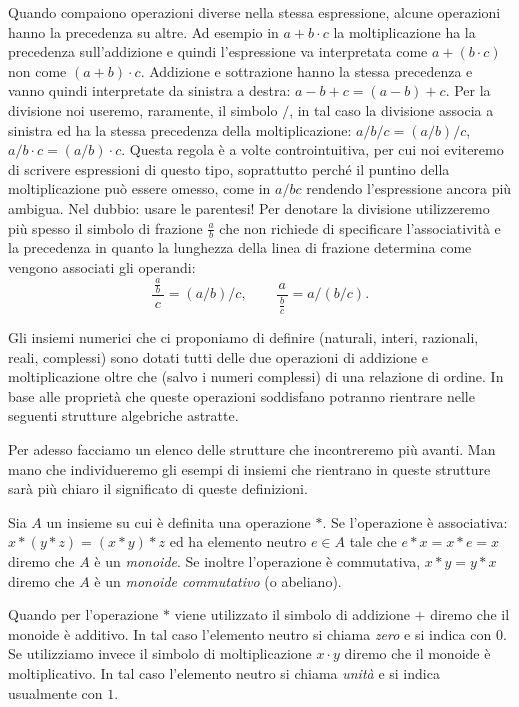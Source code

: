Quando compaiono operazioni diverse nella stessa espressione, alcune operazioni 
hanno la precedenza su altre.
Ad esempio in $a+b\cdot c$ la moltiplicazione ha la precedenza sull'addizione
e quindi l'espressione va interpretata come $a+(b\cdot c)$ non come $(a+b)\cdot c$.
Addizione e sottrazione hanno la stessa precedenza e vanno quindi interpretate da sinistra a destra:
$a-b+c = (a-b)+c$. Per la divisione noi useremo, raramente, il simbolo $/$, 
in tal caso la divisione associa a sinistra ed ha la stessa precedenza della 
moltiplicazione: $a/b/c=(a/b)/c$, $a/b\cdot c=(a/b)\cdot c$.
Questa regola è a volte controintuitiva, per cui noi eviteremo di scrivere 
espressioni di questo tipo, soprattutto perché il puntino della moltiplicazione 
può essere omesso, come in $a/bc$ rendendo l'espressione ancora più ambigua.
Nel dubbio: usare le parentesi!
Per denotare la divisione utilizzeremo più spesso il simbolo di frazione $\frac a b$ che non richiede 
di specificare l'associatività e la precedenza in quanto la lunghezza della 
linea di frazione determina come vengono associati gli operandi: 
\[
  \frac{\,\frac a b\,}{c}=(a/b)/c, \qquad 
  \frac{a}{\,\frac bc\,}=a/(b/c).
\]  

Gli insiemi numerici che ci proponiamo di definire (naturali, interi, razionali, reali, complessi)
sono dotati tutti delle due operazioni di addizione e moltiplicazione
oltre che (salvo i numeri complessi) di una relazione di ordine.
In base alle proprietà che queste operazioni soddisfano potranno rientrare nelle 
seguenti strutture algebriche astratte. 

Per adesso facciamo un elenco delle strutture che incontreremo più avanti. 
Man mano che individueremo gli esempi di insiemi che rientrano in queste strutture
sarà più chiaro il significato di queste definizioni.

\begin{definition}[monoide]%
  \label{def:monoide}%
  Sia $A$ un insieme su cui è definita una operazione $*$.
  Se l'operazione è associativa: $x*(y*z) = (x*y)*z$ 
  ed ha elemento neutro $e\in A$ tale che $e*x = x*e = x$
  diremo che $A$ è un \emph{monoide}.
  Se inoltre l'operazione è commutativa, $x*y=y*x$ 
  diremo che $A$ è un \emph{monoide commutativo} (o abeliano).
  
  Quando per l'operazione $*$ viene utilizzato il simbolo di addizione $+$
  diremo che il monoide è additivo. In tal caso l'elemento neutro 
  si chiama \emph{zero} e si indica con $0$.
  Se utilizziamo invece il simbolo di moltiplicazione $x\cdot y$
  diremo che il monoide è moltiplicativo. In tal caso l'elemento 
  neutro si chiama \emph{unità} e si indica usualmente con $1$.
  \end{definition}
  
